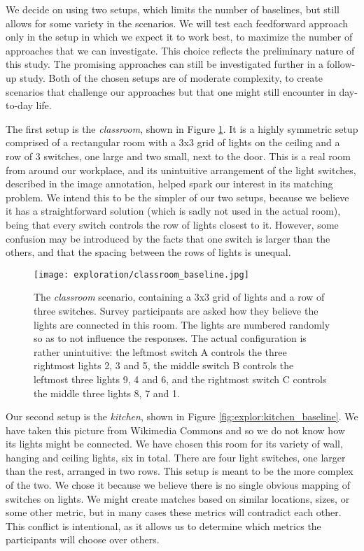     We decide on using two setups, which limits the number of baselines, but still allows for some variety in the scenarios. We will test each feedforward approach only in the setup in which we expect it to work best, to maximize the number of approaches that we can investigate. This choice reflects the preliminary nature of this study. The promising approaches can still be investigated further in a follow-up study. Both of the chosen setups are of moderate complexity, to create scenarios that challenge our approaches but that one might still encounter in day-to-day life.
    
    The first setup is the \textit{classroom}, shown in Figure \ref{fig:explor:classroom_baseline}. It is a highly symmetric setup comprised of a rectangular room with a 3x3 grid of lights on the ceiling and a row of 3 switches, one large and two small, next to the door. This is a real room from around our workplace, and its unintuitive arrangement of the light switches, described in the image annotation, helped spark our interest in its matching problem. We intend this to be the simpler of our two setups, because we believe it has a straightforward solution (which is sadly not used in the actual room), being that every switch controls the row of lights closest to it. However, some confusion may be introduced by the facts that one switch is larger than the others, and that the spacing between the rows of lights is unequal.
    
    \begin{figure}
        \centering
        \texttt{[image: exploration/classroom\_baseline.jpg]}
        \caption{The \textit{classroom} scenario, containing a 3x3 grid of lights and a row of three switches. Survey participants are asked how they believe the lights are connected in this room. The lights are numbered randomly so as to not influence the responses. The actual configuration is rather unintuitive: the leftmost switch A controls the three rightmost lights 2, 3 and 5, the middle switch B controls the leftmost three lights 9, 4 and 6, and the rightmost switch C controls the middle three lights 8, 7 and 1.}
        \label{fig:explor:classroom_baseline}
    \end{figure}
    
    Our second setup is the \textit{kitchen}, shown in Figure \ref{fig:explor:kitchen_baseline}. We have taken this picture from Wikimedia Commons \cite{FileTROY82:online} and so we do not know how its lights might be connected. We have chosen this room for its variety of wall, hanging and ceiling lights, six in total. There are four light switches, one larger than the rest, arranged in two rows. This setup is meant to be the more complex of the two. We chose it because we believe there is no single obvious mapping of switches on lights. We might create matches based on similar locations, sizes, or some other metric, but in many cases these metrics will contradict each other. This conflict is intentional, as it allows us to determine which metrics the participants will choose over others.
    
